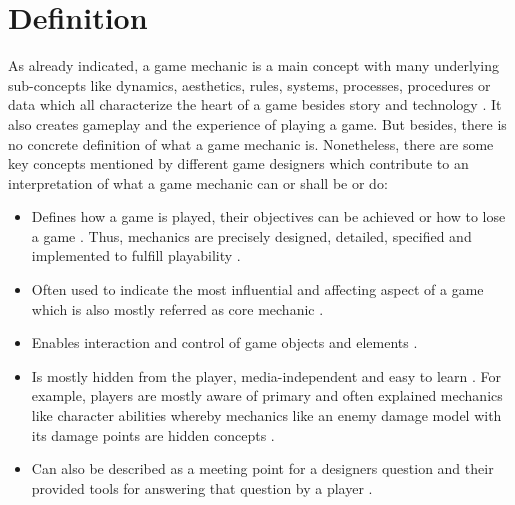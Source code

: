 \documentclass[MGS,Master,english]{twbook}%
\begin{document}
\section{Definition}
As already indicated, a game mechanic is a main concept with many underlying sub-concepts like dynamics, aesthetics, rules, systems, processes, procedures or data which all characterize the heart of a game besides story and technology \cite{gameDesign::gameMechanicsAdvancedGameDesign} \cite{gameDesign::bookOfLenses}. It also creates gameplay and the experience of playing a game. But besides, there is no concrete definition of what a game mechanic is. Nonetheless, there are some key concepts mentioned by different game designers which contribute to an interpretation of what a game mechanic can or shall be or do:
\begin{itemize}
	\item Defines how a game is played, their objectives can be achieved or how to lose a game \cite{gameDesign::bookOfLenses}. Thus, mechanics are precisely designed, detailed, specified and implemented to fulfill playability \cite{gameDesign::gameMechanicsAdvancedGameDesign} \cite{gameDesign::bookOfLenses}. 
	\item Often used to indicate the most influential and affecting aspect of a game which is also mostly referred as core mechanic \cite{gameDesign::gameMechanicsAdvancedGameDesign}. 
	\item Enables interaction and control of game objects and elements \cite{gameDesign::gameMechanicsAdvancedGameDesign}.
	\item Is mostly hidden from the player, media-independent and easy to learn \cite{gameDesign::gameMechanicsAdvancedGameDesign}. For example, players are mostly aware of primary and often explained mechanics like character abilities whereby mechanics like an enemy damage model with its damage points are hidden concepts \cite{gameDesign::gameMechanicsAdvancedGameDesign}.
	\item Can also be described as a meeting point for a designers question and their provided tools for answering that question by a player \cite{mechanic::gamasutra::MikeStout}. 
\end{itemize}
\end{document}
